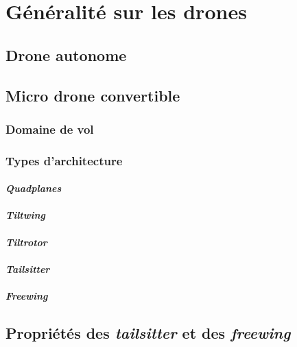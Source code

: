 \chapter{Généralité sur les drones}


\section{Drone autonome}
\section{Micro drone convertible}
    \subsection{Domaine de vol}
    \subsection{Types d'architecture}
        \subsubsection*{\textit{Quadplanes}}
        \subsubsection*{\textit{Tiltwing}}
        \subsubsection*{\textit{Tiltrotor}}
        \subsubsection*{\textit{Tailsitter}}
        \subsubsection*{\textit{Freewing}}

\section{Propriétés des \textit{tailsitter} et des \textit{freewing}}
